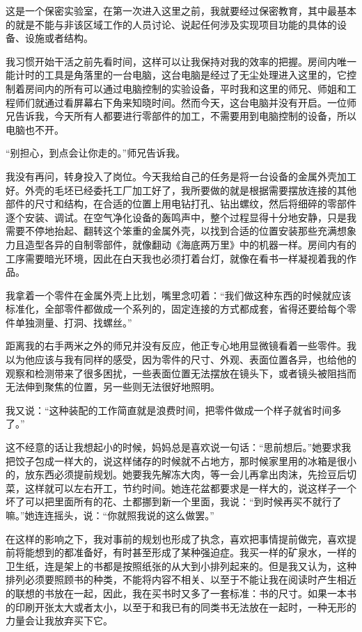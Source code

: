 \documentclass[openany,scheme = chinese, linespread = 1.5]{ctexbook}
\begin{document}
这是一个保密实验室，在第一次进入这里之前，我就要经过保密教育，其中最基本的就是不能与非该区域工作的人员讨论、说起任何涉及实现项目功能的具体的设备、设施或者结构。

我习惯开始干活之前先看时间，这样可以让我保持对我的效率的把握。房间内唯一能计时的工具是角落里的一台电脑，这台电脑是经过了无尘处理进入这里的，它控制着房间内的所有可以通过电脑控制的实验设备，平时我和这里的师兄、师姐和工程师们就通过看屏幕右下角来知晓时间。然而今天，这台电脑并没有开启。一位师兄告诉我，今天所有人都要进行零部件的加工，不需要用到电脑控制的设备，所以电脑也不开。

“别担心，到点会让你走的。”师兄告诉我。

我没有再问，转身投入了岗位。今天我给自己的任务是将一台设备的金属外壳加工好。外壳的毛坯已经委托工厂加工好了，我所要做的就是根据需要摆放连接的其他部件的尺寸和结构，在合适的位置上用电钻打孔、钻出螺纹，然后将细碎的零部件逐个安装、调试。在空气净化设备的轰鸣声中，整个过程显得十分地安静，只是我需要不停地抬起、翻转这个笨重的金属外壳，以找到合适的位置安装那些充满想象力且造型各异的自制零部件，就像翻动《海底两万里》中的机器一样。房间内有的工序需要暗光环境，因此在白天我也必须打着台灯，就像在看书一样凝视着我的作品。

我拿着一个零件在金属外壳上比划，嘴里念叨着：“我们做这种东西的时候就应该标准化，全部零件都做成一个系列的，固定连接的方式都成套，省得还要给每个零件单独测量、打洞、找螺丝。”

距离我的右手两米之外的师兄并没有反应，他正专心地用显微镜看着一些零件。我以为他应该与我有同样的感受，因为零件的尺寸、外观、表面位置各异，也给他的观察和检测带来了很多困扰，一些表面位置无法摆放在镜头下，或者镜头被阻挡而无法伸到聚焦的位置，另一些则无法很好地照明。

我又说：“这种装配的工作简直就是浪费时间，把零件做成一个样子就省时间多了。”

这不经意的话让我想起小的时候，妈妈总是喜欢说一句话：“思前想后。”她要求我把饺子包成一样大的，说这样储存的时候就不占地方，那时候家里用的冰箱是很小的，放东西必须提前规划。她要我先解冻大肉，等一会儿再拿出肉沫，先捡豆后切菜，这样就可以左右开工，节约时间。她连花盆都要求是一样大的，说这样子一个坏了可以把里面所有的花、土都挪到新一个里面，我说：“到时候再买不就行了嘛。”她连连摇头，说：“你就照我说的这么做罢。”

在这样的影响之下，我对事前的规划也形成了执念，喜欢把事情提前做完，喜欢提前将能想到的都准备好，有时甚至形成了某种强迫症。我买一样的矿泉水，一样的卫生纸，连是架上的书都是按照纸张的从大到小排列起来的。但是我又认为，这种排列必须要照顾书的种类，不能将内容不相关、以至于不能让我在阅读时产生相近的联想的书放在一起，因此，我在买书时又多了一套标准：书的尺寸。如果一本书的印刷开张太大或者太小，以至于和我已有的同类书无法放在一起时，一种无形的力量会让我放弃买下它。
\end{document}
